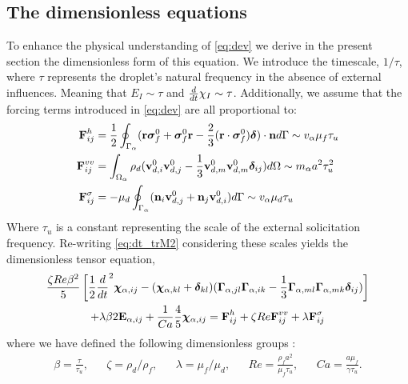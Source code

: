 \subsection{The dimensionless equations}


To enhance the physical understanding of \ref{eq:dev} we derive in the present section the dimensionless form of this equation. 
We introduce the timescale, $1/\tau$, where $\tau$ represents the droplet's natural frequency in the absence of external influences.
Meaning that $E_I\sim \tau$ and $\frac{d}{dt} \chi_I \sim \tau$. 
Additionally, we assume that the forcing terms introduced in \ref{eq:dev} are all proportional to: 
\begin{align*}
    \textbf{F}_{ij}^h
    &= \frac{1}{2}\oint_{\Gamma_{\alpha}} (\textbf{r}\bm\sigma_f^0 + \bm\sigma_f^0\textbf{r} - \frac{2}{3}(\textbf{r}\cdot \bm\sigma_f^0) \bm\delta)\cdot \textbf{n} d\Gamma 
    \sim v_\alpha \mu_f\tau_u \\
    \textbf{F}_{ij}^{vv}
    &= \int_{\Omega_{\alpha}} \rho_d (\textbf{v}_{d,i}^0\textbf{v}_{d,j}^0 - \frac{1}{3}\textbf{v}_{d,m}^0\textbf{v}_{d,m}^0 \bm\delta_{ij})  d\Omega
    \sim  m_\alpha a^2\tau_u^2 \\
    \textbf{F}_{ij}^{\sigma}
    &= - \mu_d \oint_{\Gamma_{\alpha}} (\textbf{n}_i \textbf{v}_{d,j}^0 + \textbf{n}_j \textbf{v}_{d,i}^0) d\Gamma
    \sim  v_\alpha \mu_d\tau_u
\end{align*}
Where $\tau_u$ is a constant representing the scale of the external solicitation frequency. 
Re-writing \ref{eq:dt_trM2} considering these scales yields the dimensionless tensor equation, 
\begin{multline}
    \frac{\zeta Re \beta^2}{5}
    \left[
        \frac{1}{2}\ddt^2 \bm\chi_{\alpha,ij}
        -   (\bm\chi_{\alpha,kl} + \bm\delta_{kl})
        (\bm\Gamma_{\alpha,jl}\bm\Gamma_{\alpha,ik}  
        - \frac{1}{3}
        \bm\Gamma_{\alpha,ml}\bm\Gamma_{\alpha,mk}  
        \bm\delta_{ij}
        )
    \right]\\
    + \lambda \beta 2 \textbf{E}_{\alpha,ij}
    + \frac{1}{Ca}
    \frac{4  }{5} \bm\chi_{\alpha,ij}
    = \textbf{F}_{ij}^h 
    + \zeta Re \textbf{F}_{ij}^{vv}
    + \lambda \textbf{F}_{ij}^{\sigma}
    \label{eq:dev_dim}
\end{multline}
where we have defined the following dimensionless groups : 
\begin{align*}
    \beta = \frac{\tau}{\tau_u},
    && \zeta = \rho_d /\rho_f,
    && \lambda = \mu_f/\mu_d ,
    && Re = \frac{\rho_f a^2 }{ \mu_f \tau_u},
    && Ca = \frac{a \mu_f}{\gamma \tau_u}. 
\end{align*}
